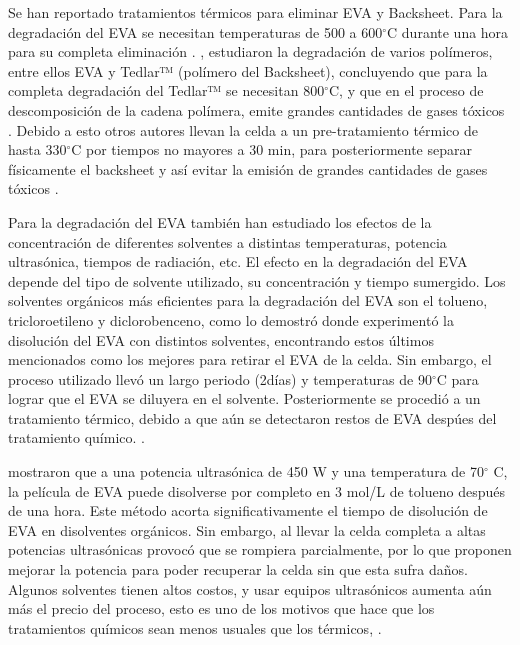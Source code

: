 Se han reportado tratamientos térmicos para eliminar EVA y Backsheet. Para la degradación del EVA se necesitan temperaturas de 500 a 600$^{\circ}$C durante una hora para su completa eliminación \citep{Pagnanelli2019}. \citet{Farneth2012}, estudiaron la degradación de varios polímeros, entre ellos EVA y Tedlar™ (polímero del Backsheet), concluyendo que para la completa degradación del Tedlar™ se necesitan 800$^{\circ}$C, y que en el proceso de descomposición de la cadena polímera, emite grandes cantidades de gases tóxicos \citep{Farneth2012}. Debido a esto otros autores llevan la celda a un pre-tratamiento térmico de hasta 330$^{\circ}$C por tiempos no mayores a 30 min, para posteriormente separar físicamente el backsheet y así evitar la emisión de grandes cantidades de gases tóxicos \citep{Wang2012}.

Para la degradación del EVA también han estudiado los efectos de la concentración de diferentes solventes a distintas temperaturas, potencia ultrasónica, tiempos de radiación, etc. El efecto en la degradación del EVA depende del tipo de solvente utilizado, su concentración y tiempo sumergido. Los solventes orgánicos más eficientes para la degradación del EVA son el tolueno, tricloroetileno y diclorobenceno, como lo demostró \citet{Sukmin2007} donde experimentó la disolución del EVA con distintos solventes, encontrando estos últimos mencionados como los mejores para retirar el EVA de la celda. Sin embargo, el proceso utilizado llevó un largo periodo (2días) y temperaturas de 90$^{\circ}$C para lograr que el EVA se diluyera en el solvente. Posteriormente se procedió a un tratamiento térmico, debido a que aún se detectaron restos de EVA despúes del tratamiento químico. \citep{Sukmin2007}. 

\citet{Kim2012} mostraron que a una potencia ultrasónica de 450 W y una temperatura de 70$^{\circ}$ C, la película de EVA puede disolverse por completo en 3 mol/L de tolueno después de una hora. Este método acorta significativamente el tiempo de disolución de EVA en disolventes orgánicos. Sin embargo, al llevar la celda completa a altas potencias ultrasónicas provocó que se rompiera parcialmente, por lo que proponen mejorar la potencia para poder recuperar la celda sin que esta sufra daños. Algunos solventes tienen altos costos, y usar equipos ultrasónicos aumenta aún más el precio del proceso, esto es uno de los motivos que hace que los tratamientos químicos sean menos usuales que los térmicos, \citep{Kim2012}.

